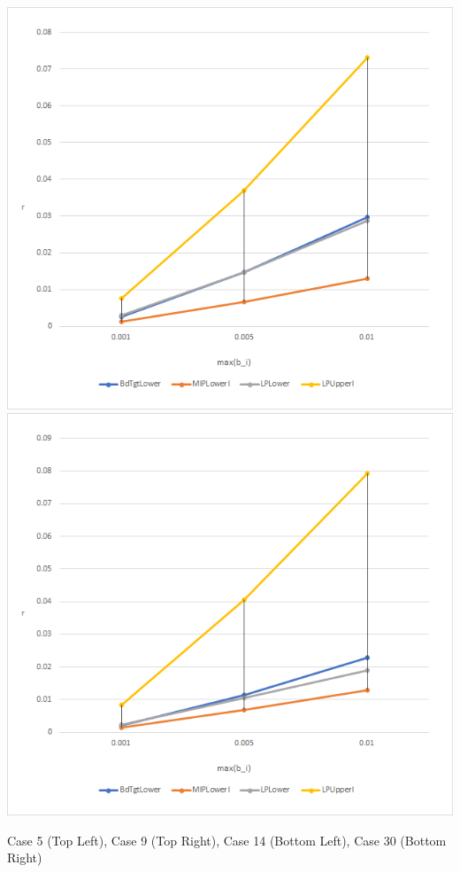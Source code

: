 \documentclass[11pt]{article}
\theoremstyle{plain}
\theoremstyle{definition}
\theoremstyle{remark}
\begin{document}
\begin{table}[h]
\begin{center}
\includegraphics[scale=0.45]{Figures/Case14}
\includegraphics[scale=0.45]{Figures/Case30}
\caption{Case 5 (Top Left), Case 9 (Top Right), Case 14 (Bottom Left), Case 30 (Bottom Right)} \ \\
\end{center}
\end{table} 
\end{document}
